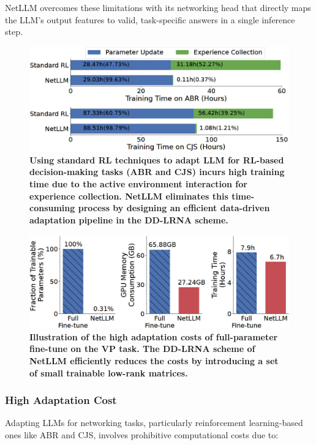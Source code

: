 \documentclass[twocolumn]{article}
\begin{document}
NetLLM overcomes these limitations with its networking head that directly maps the LLM's output features to valid, task-specific answers in a single inference step.

\begin{figure}[t]
  \centering
  \includegraphics[width=1\linewidth]{img/figure3.jpg}
  \caption{\textbf{Using standard RL techniques to adapt LLM for RL-based decision-making tasks (ABR and CJS) incurs high training time due to the active environment interaction for experience collection. NetLLM eliminates this time-consuming process by designing an efficient data-driven adaptation pipeline in the DD-LRNA scheme.}}
  \label{fig:3}
\end{figure}

\begin{figure}[t]
  \centering
  \includegraphics[width=1\linewidth]{img/figure4.jpg}
  \caption{\textbf{Illustration of the high adaptation costs of full-parameter fine-tune on the VP task. The DD-LRNA scheme of NetLLM efficiently reduces the costs by introducing a set of small trainable low-rank matrices.}}
  \label{fig:4}
\end{figure}

\subsubsection{High Adaptation Cost}
Adapting LLMs for networking tasks, particularly reinforcement learning-based ones like ABR and CJS, involves prohibitive computational costs due to:
\end{document}
